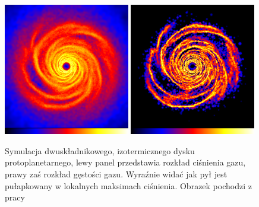 \begin{figure}
   \centering
   \includegraphics[width=0.49\textwidth]{figures/chap1_gasdisk.png}
   \includegraphics[width=0.49\textwidth]{figures/chap1_dustdisk.png}
   \caption{Symulacja dwuskładnikowego, izotermicznego dysku protoplanetarnego,
      lewy panel przedstawia rozkład ciśnienia gazu, prawy zaś rozkład gęstości
      gazu.  Wyraźnie widać jak pył jest pułapkowany w lokalnych maksimach
      ciśnienia. Obrazek pochodzi z pracy~\cite{RLP2006}}
   \label{fig:chap1_trap}
\end{figure}


